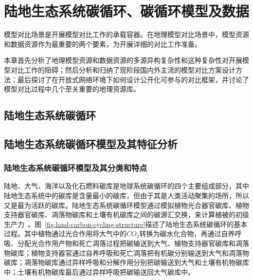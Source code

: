 \chapter{陆地生态系统碳循环、碳循环模型及数据}
\label{chap:model}

模型对比场景是开展模型对比工作的承载容器。在地理模型对比场景中，模型资源和数据资源作为最重要的两个要素，为开展详细的对比工作准备。

本章首先分析了地理模型资源和数据资源的多源异构复杂性和这种复杂性对开展模型对比工作的阻碍；然后分析和归纳了现阶段国内外主流的模型对比方案设计方法；最后探讨了在开放式网络环境下如何设计公开化可参与的对比框架，并讨论了模型对比过程中几个至关重要的地理资源库。

\section{陆地生态系统碳循环}

\section{陆地生态系统碳循环模型及其特征分析}
\label{sec:model}
\subsection{陆地生态系统碳循环模型及其分类和特点}

陆地、大气、海洋以及化石燃料碳库是地球系统碳循环的四个主要组成部分，其中陆地生态系统中的碳库是含量最小的碳库，但由于其是人类活动聚集的场所，所以又是最为活跃的碳库。陆地生态系统碳循环模型通过模拟植物光合器官碳库、植物支持器官碳库、凋落物碳库和土壤有机碳库之间的碳源汇交换，来计算植被的初级生产力~\cite{毛留喜2006陆地生态系统碳循环模型研究概述}。图~\ref{fig:land-carbon-cycling-structure}描述了陆地生态系统碳循环的基本过程。其中植物通过光合作用将大气中的$CO_2$转换为碳水化合物，再通过自养呼吸、分配光合作用产物和死亡凋落过程把碳输送到大气、植物支持器官碳库和凋落物碳库；植物支持器官通过自养呼吸和死亡凋落把有机碳分别输送到大气和凋落物碳库；凋落物碳库通过异样呼吸和分解作用分别把碳输送到大气和土壤有机物碳库中；土壤有机物碳库最后通过异样呼吸把碳输送回大气碳库中。

